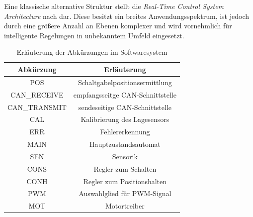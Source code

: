 Eine klassische alternative Struktur stellt die \textit{Real-Time Control System Architecture} nach \cite{albus} dar. Diese besitzt ein breites Anwendungsspektrum, ist jedoch durch eine größere Anzahl an Ebenen komplexer und wird vornehmlich für intelligente Regelungen in unbekanntem Umfeld eingesetzt. \cite{albus}
\begin{table}%
\centering
\begin{tabular}{c c}
\hline
Abkürzung & Erläuterung \\
\hline
POS & Schaltgabelpositionsermittlung\\
CAN\_RECEIVE & empfangsseitge CAN-Schnittstelle \\
CAN\_TRANSMIT & sendeseitige CAN-Schnittstelle \\
CAL & Kalibrierung des Lagesensors\\
ERR & Fehlererkennung\\
MAIN & Hauptzustandsautomat\\
SEN & Sensorik\\
CONS & Regler zum Schalten\\
CONH & Regler zum Positionshalten\\
PWM & Auswahlglied für PWM-Signal\\
MOT & Motortreiber \\

\end{tabular}
\caption{Erläuterung der Abkürzungen im Softwaresystem}
\label{tab_kurz}
\end{table} 

